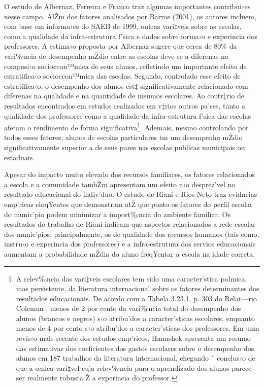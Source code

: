 \documentclass[a4paper, 12pt]{article}
\begin{document}
O estudo de Albernaz, Ferreira e Franco \citeyear{albernaz_qualidade_2002} traz algumas importantes contribui›es nesse campo. AlŽm dos fatores analisados por Barros (2001), os autores incluem, com base em informa›es do SAEB de 1999,  outras vari‡veis sobre as escolas, como a qualidade da infra-estrutura f’sica e dados sobre forma‹o e experincia dos professores. A estima‹o proposta por Albernaz sugere que cerca de 80\% da vari‰ncia de desempenho mŽdio entre as escolas deve-se a diferenas na composi‹o socioecon™mica de seus alunos, refletindo um importante efeito de estratifica‹o socioecon™mica das escolas. Segundo, controlado esse efeito de estratifica‹o, o desempenho dos alunos est‡ significativamente relacionado com diferenas na qualidade e na quantidade de insumos escolares. Ao contr‡rio de resultados encontrados em estudos realizados em v‡rios outros pa’ses, tanto a qualidade dos professores como a qualidade da infra-estrutura f’sica das escolas afetam o rendimento de forma significativa\footnote{A relev‰ncia das vari‡veis escolares tem sido uma caracter’stica polmica, mas persistente, da literatura internacional sobre os fatores determinantes dos resultados educacionais. De acordo com a Tabela 3.23.1, p. 303 do Relat—rio Coleman \citeyear{coleman_equality_1966}, menos de 2 por cento da vari‰ncia total do desempenho dos alunos (brancos e negros) s‹o atribu’dos a caracter’sticas escolares, enquanto menos de 4 por cento s‹o atribu’dos a caracter’sticas dos professores. Em uma revis‹o mais recente dos estudos emp’ricos, Hanushek \citeyear{hanushek_expenditures_1989} apresenta um resumo das estimativas dos coeficientes dos gastos escolares sobre o desempenho dos alunos em 187 trabalhos da literatura internacional, chegando ˆ conclus‹o de que a œnica vari‡vel cuja relev‰ncia para o aprendizado dos alunos parece ser realmente robusta Ž a experincia do professor.}. Ademais, mesmo controlando por todos esses fatores, alunos de escolas particulares tm um desempenho mŽdio significativamente superior a de seus pares nas escolas publicas municipais ou estaduais.

Apesar do impacto muito elevado dos recursos familiares, os fatores relacionados a escola e a comunidade tambŽm apresentam um efeito n‹o desprez’vel no resultado educacional do indiv’duo. O estudo de Riani e Rios-Neto \citeyear{riani_background_2008} traz evidncias emp’ricas eloqŸentes que demonstram atŽ que ponto os fatores do perfil escolar do munic’pio podem minimizar a import‰ncia do ambiente familiar. Os resultados do trabalho de Riani indicam que aspectos relacionados a rede escolar dos munic’pios, principalmente, os de qualidade dos recursos humanos (tais como, instru‹o e experincia dos professores) e a infra-estrutura dos servios educacionais aumentam a probabilidade mŽdia do aluno freqŸentar a escola na idade correta.
\end{document}
